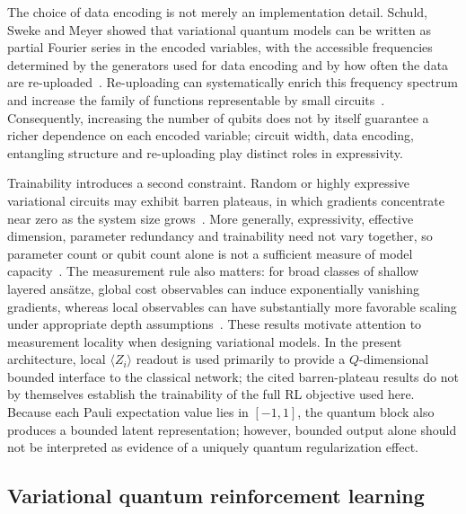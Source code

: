 \documentclass[aps,floatfix,superscriptaddress,twocolumn,tightenlines,amsmath,amssymb,nofootinbib,10pt,longbibliography,prl]{revtex4-2}
\begin{document}
The choice of data encoding is not merely an implementation detail. Schuld, Sweke and Meyer
showed that variational quantum models can be written as partial Fourier series in the
encoded variables, with the accessible frequencies determined by the generators used for
data encoding and by how often the data are re-uploaded~\cite{Schuld2021Effectofdataencodi}.
Re-uploading can systematically enrich this frequency spectrum and increase the family of
functions representable by small circuits~\cite{PrezSalinas2020Datareuploadingfor}.
Consequently, increasing the number of qubits does not by itself guarantee a richer
dependence on each encoded variable; circuit width, data encoding, entangling structure and
re-uploading play distinct roles in expressivity.

Trainability introduces a second constraint. Random or highly expressive variational
circuits may exhibit barren plateaus, in which gradients concentrate near zero as the system
size grows~\cite{McClean2018Barrenplateausinqu,Holmes2022ConnectingAnsatzEx}. More
generally, expressivity, effective dimension, parameter redundancy and trainability need not
vary together, so parameter count or qubit count alone is not a sufficient measure of model
capacity~\cite{Haug2021CapacityQuantumGeometry}. The measurement rule also matters: for
broad classes of shallow layered ans\"atze, global cost observables can induce exponentially
vanishing gradients, whereas local observables can have substantially more favorable scaling
under appropriate depth assumptions~\cite{Cerezo2021Costfunctiondepend}. These results
motivate attention to measurement locality when designing variational models. In the present
architecture, local $\langle Z_i\rangle$ readout is used primarily to provide a
$Q$-dimensional bounded interface to the classical network; the cited barren-plateau results
do not by themselves establish the trainability of the full RL objective used here. Because
each Pauli expectation value lies in $[-1,1]$, the quantum block also produces a bounded
latent representation; however, bounded output alone should not be interpreted as evidence
of a uniquely quantum regularization effect.

\subsection{Variational quantum reinforcement learning}
\label{subsec:bg-qrl}
\end{document}

